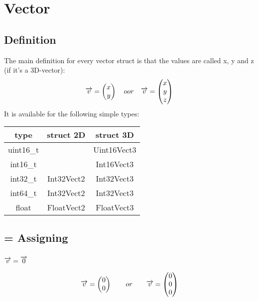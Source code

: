 \section{Vector}
\subsection{Definition}
The main definition for every vector struct is that the values are called x, y and z (if it's a 3D-vector):
\begin{equation}
\overrightarrow{v} = \begin{pmatrix}x\\y\end{pmatrix} \quad oor \quad \overrightarrow{v} = \begin{pmatrix}x\\y\\z\end{pmatrix}
\end{equation}
It is available for the following simple types:\\
\begin{tabular}{c|c|c}
type		& struct 2D		& struct 3D\\ \hline
uint16\_t	& 				& Uint16Vect3	\\
int16\_t 	& 				& Int16Vect3	\\
int32\_t	& Int32Vect2	& Int32Vect3	\\
int64\_t	& Int32Vect2	& Int32Vect3	\\
float		& FloatVect2	& FloatVect3	
\end{tabular}


\subsection{= Assigning}
\subsubsection*{$\overrightarrow{v} = \overrightarrow{0}$}
\begin{equation}
 \overrightarrow{v} = \begin{pmatrix} 0 \\ 0 \end{pmatrix} \qquad or \qquad  \overrightarrow{v} = \begin{pmatrix} 0 \\ 0 \\ 0 \end{pmatrix}
\end{equation}

